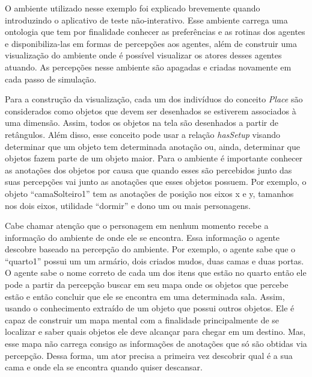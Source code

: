 O ambiente utilizado nesse exemplo foi explicado brevemente quando introduzindo o
aplicativo de teste não-interativo. Esse ambiente carrega uma ontologia que
tem por finalidade conhecer as preferências e as rotinas dos agentes e
disponibiliza-las em formas de percepções aos agentes, além de
construir uma visualização do ambiente onde é possível visualizar os atores
desses agentes atuando. As percepções nesse ambiente são apagadas e criadas
novamente em cada passo de simulação.

Para a construção da visualização, cada um dos indivíduos do conceito
\emph{Place} são considerados como objetos que devem ser desenhados se
estiverem associados à uma dimensão. Assim, todos os objetos na tela são
desenhados a partir de retângulos. Além disso, esse conceito pode usar a
relação \emph{hasSetup} visando determinar que um objeto tem determinada
anotação ou, ainda, determinar que objetos fazem parte de um objeto maior.
Para o ambiente é importante conhecer as anotações dos objetos por causa que
quando esses são percebidos junto das suas percepções vai junto as anotações
que esses objetos possuem. Por exemplo, o objeto ``camaSolteiro1'' tem as
anotações de posição nos eixos x e y, tamanhos nos dois eixos, utilidade
``dormir'' e dono um ou mais personagens.

Cabe chamar atenção que o personagem em nenhum momento recebe a informação
do ambiente de onde ele se encontra. Essa informação o agente descobre baseado
na percepção do ambiente. Por exemplo, o agente sabe que o ``quarto1'' possui um
um armário, dois criados mudos, duas camas e duas portas. O agente sabe o nome
correto de cada um dos itens que estão no quarto então ele pode a partir da
percepção buscar em seu mapa onde os objetos que percebe estão e então
concluir que ele se encontra em uma determinada sala. Assim, usando o
conhecimento extraído de um objeto que possui outros objetos. Ele é capaz de
construir um mapa mental com a finalidade principalmente de se localizar e
saber quais objetos ele deve alcançar para chegar em um destino. Mas, esse
mapa não carrega consigo as informações de anotações que só são obtidas via
percepção. Dessa forma, um ator precisa a primeira vez descobrir qual é a sua
cama e onde ela se encontra quando quiser descansar.

